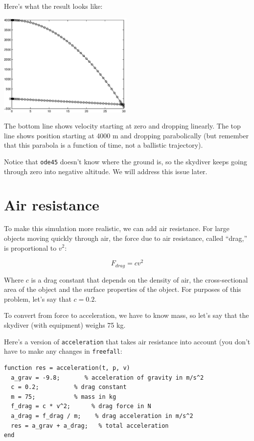 \documentclass{book}
\begin{document}
Here's what the result looks like:

\beforefig \centerline{\includegraphics[height=2in]{figs/freefall.eps}}

The bottom line shows velocity starting at zero and dropping
linearly. The top line shows position starting at 4000 m and
dropping parabolically (but remember that this parabola
is a function of time, not a ballistic trajectory).

Notice that {\tt ode45} doesn't know where the ground is, so the
skydiver keeps going through zero into negative altitude. We will
address this issue later.


\section{Air resistance}

To make this simulation more realistic, we can add air resistance.
For large objects moving quickly through air, the force due to air
resistance, called ``drag,'' is proportional to $v^2$:

\[ F_{drag} = c v^2 \]

Where $c$ is a drag constant that depends on the density of
air, the cross-sectional area of the object and
the surface properties of the object. For purposes of this
problem, let's say that $c = 0.2$.

To convert from force to acceleration, we have to know mass, so let's
say that the skydiver (with equipment) weighs 75 kg.

Here's a version of {\tt acceleration} that takes air resistance
into account (you don't have to make any changes in {\tt freefall}:

\begin{verbatim}
function res = acceleration(t, p, v)
  a_grav = -9.8;       % acceleration of gravity in m/s^2
  c = 0.2;          % drag constant
  m = 75;           % mass in kg
  f_drag = c * v^2;      % drag force in N
  a_drag = f_drag / m;    % drag acceleration in m/s^2
  res = a_grav + a_drag;   % total acceleration
end
\end{verbatim}
\end{document}

